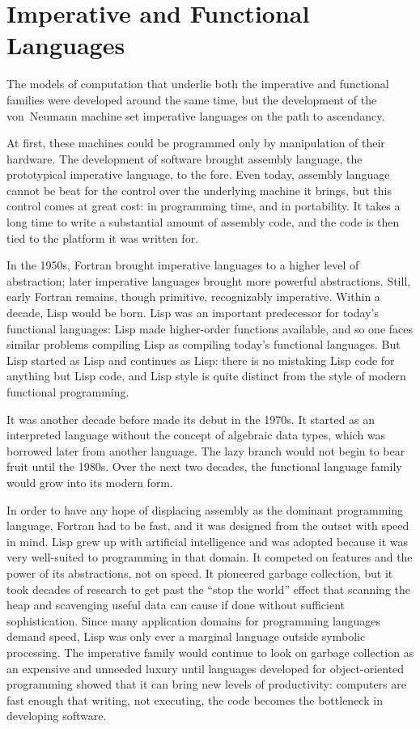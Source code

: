 \label{conclusion:back}
\section{Imperative and Functional Languages}
The models of computation that underlie both the imperative and functional families were developed around the same time, but the development of the von~Neumann machine set imperative languages on the path to ascendancy.

At first, these machines could be programmed only by manipulation of their hardware. The development of software brought assembly language, the prototypical imperative language, to the fore. Even today, assembly language cannot be beat for the control over the underlying machine it brings, but this control comes at great cost: in programming time, and in portability. It takes a long time to write a substantial amount of assembly code, and the code is then tied to the platform it was written for.

In the 1950s, Fortran brought imperative languages to a higher level of abstraction; later imperative languages brought more powerful abstractions. Still, early Fortran remains, though primitive, recognizably imperative. Within a decade, Lisp would be born. Lisp was an important predecessor for today's functional languages: Lisp made higher-order functions available, and so one faces similar problems compiling Lisp as compiling today's functional languages. But Lisp started as Lisp and continues as Lisp: there is no mistaking Lisp code for anything but Lisp code, and Lisp style is quite distinct from the style of modern functional programming.

It was another decade before \ML made its debut in the 1970s. It started as an interpreted language without the concept of algebraic data types, which was borrowed later from another language. The lazy branch would not begin to bear fruit until the 1980s. Over the next two decades, the functional language family would grow into its modern form.

In order to have any hope of displacing assembly as the dominant programming language, Fortran had to be fast, and it was designed from the outset with speed in mind. Lisp grew up with artificial intelligence and was adopted because it was very well-suited to programming in that domain. It competed on features and the power of its abstractions, not on speed. It pioneered garbage collection, but it took decades of research to get past the ``stop the world'' effect that scanning the heap and scavenging useful data can cause if done without sufficient sophistication. Since many application domains for programming languages demand speed, Lisp was only ever a marginal language outside symbolic processing. The imperative family would continue to look on garbage collection as an expensive and unneeded luxury until languages developed for object-oriented programming showed that it can bring new levels of productivity: computers are fast enough that writing, not executing, the code becomes the bottleneck in developing software.

